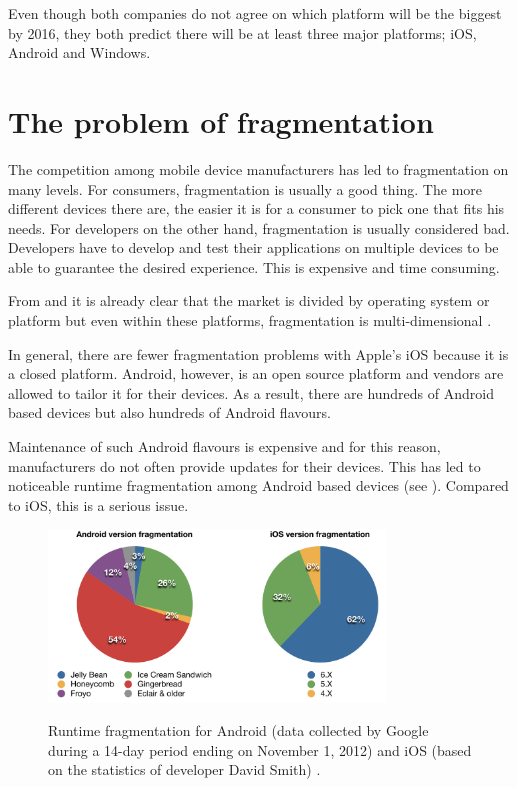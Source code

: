 \npar Even though both companies do not agree on which platform will be the biggest by 2016, they both predict there will be at least three major platforms; iOS, Android and Windows. 


\section{The problem of fragmentation}

\npar The competition among mobile device manufacturers has led to fragmentation on many levels. For consumers, fragmentation is usually a good thing. The more different devices there are, the easier it is for a consumer to pick one that fits his needs. For developers on the other hand, fragmentation is usually considered bad. Developers have to develop and test their applications on multiple devices to be able to guarantee the desired experience. This is expensive and time consuming.

\npar From  and  it is already clear that the market is divided by operating system or platform but even within these platforms, fragmentation is multi-dimensional \citep{Kindel}.

\npar In general, there are fewer fragmentation problems with Apple's iOS because it is a closed platform. Android, however, is an open source platform and vendors are allowed to tailor it for their devices. As a result, there are hundreds of Android based devices but also hundreds of Android flavours.

\npar Maintenance of such Android flavours is expensive and for this reason, manufacturers do not often provide updates for their devices. This has led to noticeable runtime fragmentation among Android based devices (see ). Compared to iOS, this is a serious issue.

\begin{figure}[h!]
    \begin{center}
        \label{fig:runtime_fragmentation}
        \includegraphics[width=0.8\textwidth]{figs/os_distribution.pdf}
        \caption{
            Runtime fragmentation for Android (data collected by Google during a 14-day period ending on November 1, 2012) \citep{android_distribution} and iOS (based on the statistics of developer David Smith) \citep{ios_distribution}.
        }
    \end{center}
\end{figure}

